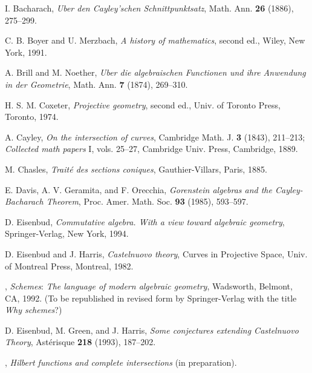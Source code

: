 \documentclass{bull-l}
\theoremstyle{pplain}
\theoremstyle{definition}
\begin{document}

\begin{thebibliography}{EGH2}

I. Bacharach, \emph{Uber den Cayley'schen Schnittpunktsatz}, Math.
Ann. \textbf{26} (1886), 275--299.

 C. B. Boyer and U. Merzbach, \emph{A history of mathematics},
second ed., Wiley, New York, 1991. 

 A. Brill and M. Noether, \emph{Uber die algebraischen
Functionen und ihre Anwendung in der Geometrie}, Math. Ann. \textbf{7}
(1874), 269--310.

 H. S. M. Coxeter, \emph{Projective geometry}, second ed.,
Univ. of  Toronto Press, Toronto, 1974. 

 A. Cayley, \emph{On the intersection of curves}, Cambridge
Math. J. \textbf{3} (1843), 211--213; \emph{Collected math papers} I, vols.
25--27, Cambridge Univ. Press, Cambridge, 1889.


 M. Chasles, %
\emph{Trait\'e des sections coniques},
Gauthier-Villars, Paris, 1885.

 E. Davis, A. V. Geramita, and F. Orecchia, \emph{Gorenstein 
algebras and the Cayley-Bacharach Theorem}, Proc. Amer. Math. Soc. 
\textbf{93} (1985), 593--597. 

 D. Eisenbud, \emph{Commutative algebra.  With a view toward 
algebraic geometry}, Springer-Verlag, New York, 1994. 

 D. Eisenbud and J. Harris, \emph{Castelnuovo theory}, Curves
in Projective Space, Univ. of Montreal Press, Montreal, 1982. 

 \bysame, \emph{Schemes}: \emph{The language of modern 
algebraic geometry}, Wadsworth, Belmont, CA, 1992. (To be republished in
revised form by Springer-Verlag with the title \emph{Why schemes}?)

 D. Eisenbud, M. Green, and J. Harris, \emph{Some conjectures
extending Castelnuovo Theory}, Ast\'erisque \textbf{218} (1993), 187--202.

 \bysame, \emph{Hilbert functions and complete
intersections} (in
preparation).


\end{thebibliography}
\end{document}
